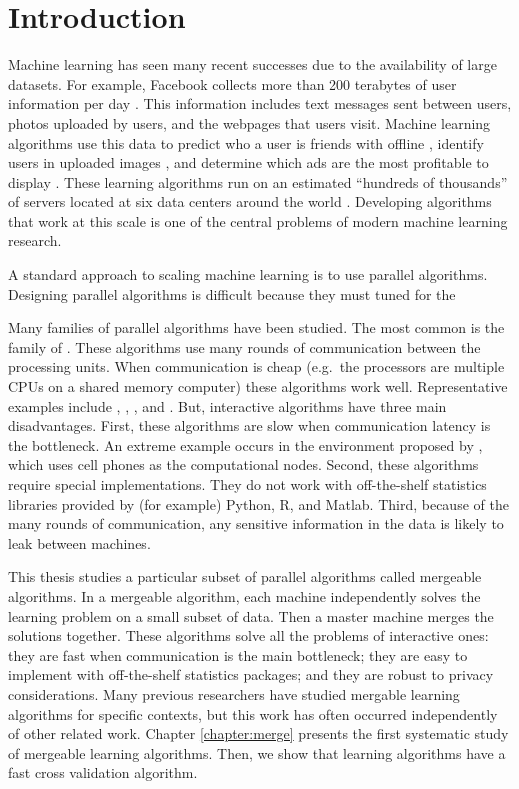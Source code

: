 \documentclass[thesis.tex]{subfiles}
\begin{document}
\chapter{Introduction}
\label{chapter:intro}

\noindent
Machine learning has seen many recent successes due to the availability of large datasets.
For example, Facebook collects more than 200 terabytes of user information per day \citep{facebook2014}.
This information includes text messages sent between users,
photos uploaded by users,
and the webpages that users visit.
Machine learning algorithms use this data to
predict who a user is friends with offline \citep{curtiss2013unicorn},
identify users in uploaded images \citep{taigman2014deepface},
and determine which ads are the most profitable to display \citep{he2014practical}.
These learning algorithms run on an estimated ``hundreds of thousands'' of servers located at six data centers around the world \citep{facebookFAQ}.
Developing algorithms that work at this scale is one of the central problems of modern machine learning research.

A standard approach to scaling machine learning is to use parallel algorithms.
Designing parallel algorithms is difficult because they must tuned for the

Many families of parallel algorithms have been studied.
The most common is the family of .
These algorithms use many rounds of communication between the processing units.
When communication is cheap 
(e.g.\ the processors are multiple CPUs on a shared memory computer)
these algorithms work well.
Representative examples include \citet{boyd2011distributed}, \citet{li2014scaling}, \cite{ma2015adding}, and \cite{zhao2017scope}. 
But, interactive algorithms have three main disadvantages.
First, these algorithms are slow when communication latency is the bottleneck.
An extreme example occurs in the  environment proposed by \cite{mcmahan2017communication}, which uses cell phones as the computational nodes. 
Second, these algorithms require special implementations.
They do not work with off-the-shelf statistics libraries provided by (for example) Python, R, and Matlab.
Third, because of the many rounds of communication, any sensitive information in the data is likely to leak between machines.

This thesis studies a particular subset of parallel algorithms called mergeable algorithms.
In a mergeable algorithm,
each machine independently solves the learning problem on a small subset of data.
Then a master machine merges the solutions together.
These algorithms solve all the problems of interactive ones:
they are fast when communication is the main bottleneck;
they are easy to implement with off-the-shelf statistics packages;
and they are robust to privacy considerations.
Many previous researchers have studied mergable learning algorithms for specific contexts,
but this work has often occurred independently of other related work.
Chapter \ref{chapter:merge} presents the first systematic study of mergeable learning algorithms.
Then, we show that learning algorithms have a fast cross validation algorithm.
\end{document}
